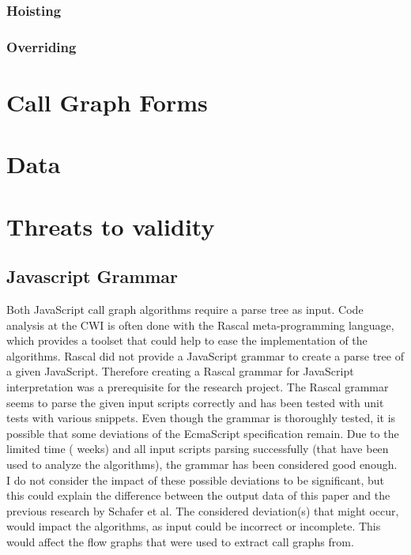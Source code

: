 \documentclass[journal,10pt]{IEEEtran} %
\begin{document}
\subsubsection{Hoisting}


\subsubsection{Overriding}


\section{Call Graph Forms}


\section{Data}

\section{Threats to validity}
\subsection{Javascript Grammar}
Both JavaScript call graph algorithms require a parse tree as input. Code analysis at the CWI is often done with the Rascal meta-programming language, which provides a toolset that could help to ease the implementation of the algorithms. Rascal did not provide a JavaScript grammar to create a parse tree of a given JavaScript. Therefore creating a Rascal grammar for JavaScript interpretation was a prerequisite for the research project. The Rascal grammar seems to parse the given input scripts correctly and has been tested with unit tests with various snippets. Even though the grammar is thoroughly tested, it is possible that some deviations of the EcmaScript specification remain.
Due to the limited time ( weeks) and all input scripts parsing successfully (that have been used to analyze the algorithms), the grammar has been considered good enough. I do not consider the impact of these possible deviations to be significant, but this could explain the difference between the output data of this paper and the previous research by Schafer et al. %
The considered deviation(s) that might occur, would impact the algorithms, as input could be incorrect or incomplete. This would affect the flow graphs that were used to extract call graphs from.
\end{document}
